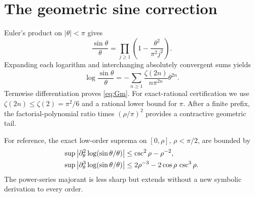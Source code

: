 \section{The geometric sine correction}\label{app:geometry}

Euler's product on $|\theta|<\pi$ gives
\[
\frac{\sin\theta}{\theta}=\prod_{j\ge1}
\left(1-\frac{\theta^2}{\pi^2j^2}\right).
\]
Expanding each logarithm and interchanging absolutely convergent sums yields
\[
\log\frac{\sin\theta}{\theta}
=-\sum_{n\ge1}\frac{\zeta(2n)}{n\pi^{2n}}\theta^{2n}.
\]
Termwise differentiation proves \eqref{eq:Gm}.  For exact-rational
certification we use $\zeta(2n)\le\zeta(2)=\pi^2/6$ and a rational lower
bound for $\pi$.  After a finite prefix, the factorial-polynomial ratio times
$(\rho/\pi)^2$ provides a contractive geometric tail.

For reference, the exact low-order suprema on $[0,\rho]$, $\rho<\pi/2$, are
bounded by
\begin{align*}
\sup\left|\partial_\theta^2\log(\sin\theta/\theta)\right|
&\le \csc^2\rho-\rho^{-2},\\
\sup\left|\partial_\theta^3\log(\sin\theta/\theta)\right|
&\le 2\rho^{-3}-2\cos\rho\,\csc^3\rho.
\end{align*}
The power-series majorant is less sharp but extends without a new symbolic
derivation to every order.
